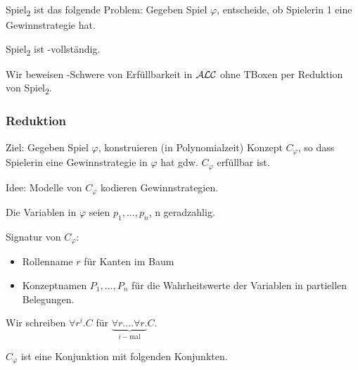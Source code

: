 \begin{definition}
    Spiel\textsubscript{2} ist das folgende Problem: Gegeben Spiel $\varphi$, entscheide, ob Spielerin 1 eine Gewinnstrategie hat.
\end{definition}

\begin{theorem}[Schaefer 1978]
    Spiel\textsubscript{2} ist \PSpace-vollständig.
\end{theorem}

Wir beweisen \PSpace-Schwere von Erfüllbarkeit in $\mathcal{A}\mathcal{L}\mathcal{C}$ ohne TBoxen per Reduktion von Spiel\textsubscript{2}.

\subsubsection{Reduktion}

Ziel: Gegeben Spiel $\varphi$, konstruieren (in Polynomialzeit) Konzept $C_\varphi$, so dass Spielerin eine Gewinnstrategie in $\varphi$ hat gdw. $C_\varphi$ erfüllbar ist.

Idee: Modelle von $C_\varphi$ kodieren Gewinnstrategien.

Die Variablen in $\varphi$ seien $p_1, \ldots, p_n$, n geradzahlig.

Signatur von $C_\varphi$:
\begin{itemize}
    \item Rollenname $r$ für Kanten im Baum
    \item Konzeptnamen $P_1, \ldots, P_n$ für die Wahrheitswerte der Variablen in partiellen Belegungen.
\end{itemize}
Wir schreiben $\forall r^i.C$ für $\underbrace{\forall r.\ldots\forall r.}_{i-\text{mal}}C$.

$C_\varphi$ ist eine Konjunktion mit folgenden Konjunkten.

